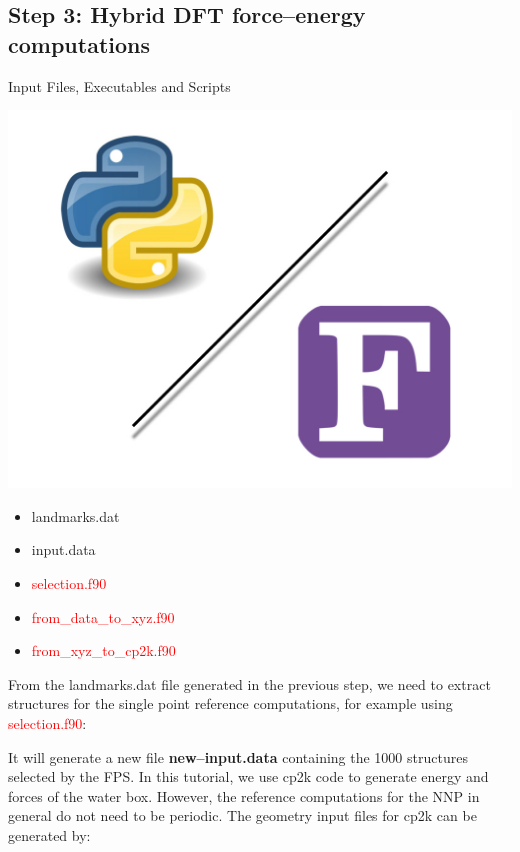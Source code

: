\documentclass[12pt]{article}
\begin{document}
\subsection{Step 3: Hybrid DFT force--energy computations}
\begin{mybox2}{{Input Files, Executables and Scripts}}
\begin{minipage}[c]{0.5\linewidth}
\includegraphics[scale=0.1]{latex_files/Python-fortran.jpeg}
\end{minipage}
\begin{minipage}[c]{0.5\linewidth}
\begin{itemize}
    \item landmarks.dat
    \item input.data
    \item \textcolor{red}{selection.f90}
    \item \textcolor{red}{from\_data\_to\_xyz.f90}
    \item \textcolor{red}{from\_xyz\_to\_cp2k.f90}
\end{itemize}
\end{minipage}
\end{mybox2}

From the landmarks.dat file generated in the previous step, we need to extract structures for the single point reference computations, for example using \textcolor{red}{selection.f90}:

\begin{center}
\end{center}
It will generate a new file \textbf{new--input.data} containing the 1000 structures selected by the FPS. In this tutorial, we use cp2k code to generate energy and forces of the water box. However, the reference computations for the NNP in general do not need to be periodic. The geometry input files for cp2k can be generated by: 
\end{document}
